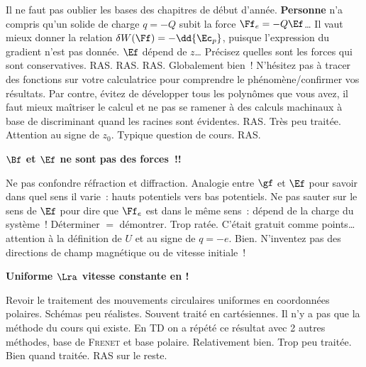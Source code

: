 \documentclass[a4paper, 10pt, final, garamond]{book}
\begin{document}
\setcounter{section}{0}
\begin{enumerate}
	Il ne faut pas oublier les bases des chapitres de début d'année.
	\textbf{Personne} n'a compris qu'un solide de charge $q = -Q$ subit la force
	$\Ff_e = -Q\Ef$…
	Il vaut mieux donner la relation $\delta W(\Ff) = -\dd{\Ec_p}$, puisque
	l'expression du gradient n'est pas donnée.
	$\Ef$ dépend de $z$…
	Précisez quelles sont les forces qui sont conservatives.
	RAS.
	RAS.
	RAS.
	Globalement bien~! N'hésitez pas à tracer des fonctions sur votre calculatrice
	pour comprendre le phénomène/confirmer vos résultats. Par contre, évitez de
	développer tous les polynômes que vous avez, il faut mieux maîtriser le calcul
	et ne pas se ramener à des calculs machinaux à base de discriminant quand les
	racines sont évidentes.
	RAS.
	Très peu traitée.
	Attention au signe de $z_0$.
	Typique question de cours.
	RAS.
\end{enumerate}

\textbf{$\Bf$ et $\Ef$ ne sont pas des forces~!!}
\begin{enumerate}
	Ne pas confondre réfraction et diffraction.
	Analogie entre $\gf$ et $\Ef$ pour savoir dans quel sens il varie~: hauts
	potentiels vers bas potentiels. Ne pas sauter sur le sens de $\Ef$ pour dire
	que $\Ff_e$ est dans le même sens~: dépend de la charge du système~!
	Déterminer $=$ démontrer.
	Trop ratée. C'était gratuit comme points… attention à la définition de $U$ et
	au signe de $q = -e$.
	Bien.
	N'inventez pas des directions de champ magnétique ou de vitesse initiale~!
	\begin{center}
		\textbf{Uniforme $\Lra$ vitesse constante en  !}
	\end{center}
	Revoir le traitement des mouvements circulaires uniformes en coordonnées
	polaires. Schémas peu réalistes.
	Souvent traité en cartésiennes. Il n'y a pas que la méthode du cours qui
	existe. En TD on a répété ce résultat avec 2 autres méthodes, base de
	\textsc{Frenet} et base polaire.
	Relativement bien.
	Trop peu traitée.
	Bien quand traitée.
	\smallbreak
	RAS sur le reste.
\end{enumerate}
\end{document}
